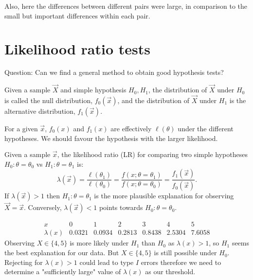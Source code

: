 \documentclass[10pt, a4paper]{article}
\begin{document}
Also,
here the differences between different pairs were large,
in comparison to the small but important differences within each pair.

\newpage

\section{Likelihood ratio tests}
Question:
Can we find a general method to obtain good hypothesis tests?

\begin{definition}
    Given a sample $\vec{X}$ and simple hypothesis $H_0, H_1$,
    the distribution of $\vec{X}$ under $H_0$ is called the null distribution,
    $f_0(\vec{x})$,
    and the distribution of $\vec{X}$ under $H_1$ is the alternative distribution,
    $f_1(\vec{x})$.
\end{definition}

For a given $\vec{x}$,
$f_0(x)$ and $f_1(x)$ are effectively $\ell(\theta)$ under the different hypotheses.
We should favour the hypothesis with the larger likelihood.

\begin{definition}
    Given a sample $\vec{x}$,
    the likelihood ratio
    (LR)
    for comparing two simple hypotheses $H_0 : \theta = \theta_0$ vs $H_1 : \theta = \theta_1$ is:
    \[
    \lambda(\vec{x}) = \frac{\ell(\theta_1)}{\ell(\theta_0)} = \frac{f(x; \theta = \theta_1)}{f(x; \theta = \theta_0)} = \frac{f_1(\vec{x})}{f_0(\vec{x})}.
    \]
    If $\lambda(\vec{x}) > 1$ then $H_1 : \theta = \theta_1$ is the more plausible explanation for observing $\vec{X} = \vec{x}$.
    Conversely,
    $\lambda(\vec{x}) < 1$ points towards $H_0 : \theta = \theta_0$.
\end{definition}

\begin{example}
    \[
    \begin{array}{c|cccc|cc}
         x & 0 & 1 & 2 & 3 & 4 & 5 \\
         \hline
         \lambda(x) &  0.0321 & 0.0934 & 0.2813 & 0.8438 & 2.5304 & 7.6058
    \end{array}
    \]
    Observing $X \in \{4, 5\}$ is more likely under $H_1$ than $H_0$ as $\lambda(x) > 1$,
    so $H_1$ seems the best explanation for our data.
    But $X \in \{4, 5\}$ is still possible under $H_0$.
    Rejecting for $\lambda(x) > 1$ could lead to type $I$ errors therefore we need to determine a
    "sufficiently large"
    value of $\lambda(x)$ as our threshold.
\end{example}
\end{document}
